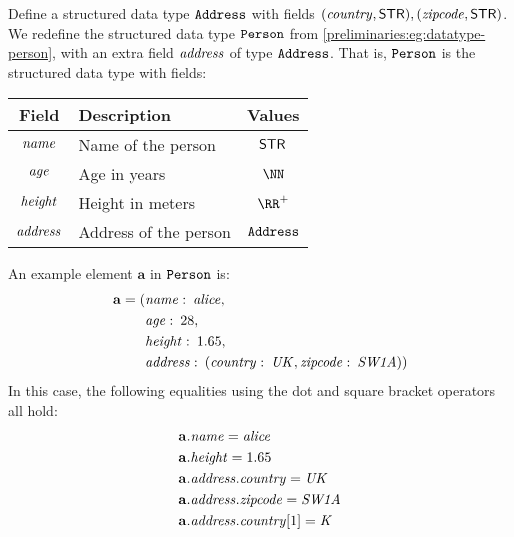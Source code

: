 \begin{example}\label{preliminaries:eg:datatype-person-deep}
  Define a structured data type ${\mathtt{Address}}$ with fields $(\mathit{country}, \mathsf{STR}{}), (\mathit{zipcode}, \mathsf{STR}{})$. We redefine the structured data type ${\mathtt{Person}}$ from \cref{preliminaries:eg:datatype-person}, with an extra field $\mathit{address}$ of type ${\mathtt{Address}}$. That is, ${\mathtt{Person}}$ is the structured data type with fields:
  \begin{table}[H]
    \centering
    \begin{tabular}{cp{20em}c}
      Field                 & Description           & Values \\ \toprule
      $\mathit{name}$    & Name of the person    & $\mathsf{STR}{}$ \\ \midrule
      $\mathit{age}$     & Age in years          & $\NN$ \\ \midrule
      $\mathit{height}$  & Height in meters      & $\RR^+$ \\ \midrule
      $\mathit{address}$ & Address of the person & ${\mathtt{Address}}$ \\ \midrule
    \end{tabular}
  \end{table}
  An example element $\mathbf{a}$ in ${\mathtt{Person}}$ is:
  \begin{align*}
    \mathbf{a} = ( & \mathit{name}:\: \mathit{alice}, \\
    & \mathit{age}:\: 28, \\
    & \mathit{height}:\: 1.65, \\
    & \mathit{address}:\:
    (\mathit{country}:\: \mathit{UK}, \mathit{zipcode}:\: \mathit{SW1A}) )
  \end{align*}
  In this case, the following equalities using the dot and square bracket operators all hold:
  \begin{align*}
    & \mathbf{a}.\mathit{name} = \mathit{alice} \\
    & \mathbf{a}.\mathit{height} = 1.65 \\
    & \mathbf{a}.\mathit{address}.\mathit{country} = \mathit{UK} \\
    & \mathbf{a}.\mathit{address}.\mathit{zipcode} = \mathit{SW1A} \\
    & \mathbf{a}.\mathit{address}.\mathit{country}[1] = \mathit{K}
  \end{align*}
\end{example}

